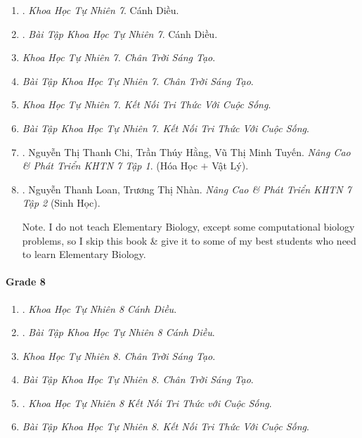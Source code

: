 \documentclass{article}
\begin{document}
\begin{enumerate}	
	\item \cite{SGK_KHTN_7_Canh_Dieu}. {\it Khoa Học Tự Nhiên 7}. Cánh Diều.\hfill{\sf[done]}
	
	\item \cite{SBT_KHTN_7_Canh_Dieu}. {\it Bài Tập  Khoa Học Tự Nhiên 7}. Cánh Diều.\hfill{\sf[done]}
	
	\item {\it Khoa Học Tự Nhiên 7. Chân Trời Sáng Tạo}.
	
	\item {\it Bài Tập Khoa Học Tự Nhiên 7. Chân Trời Sáng Tạo}.
	
	\item {\it Khoa Học Tự Nhiên 7. Kết Nối Tri Thức Với Cuộc Sống}.
	
	\item {\it Bài Tập Khoa Học Tự Nhiên 7. Kết Nối Tri Thức Với Cuộc Sống}.
	
	\item \cite{ncpt_KHTN_7_tap_1}. Nguyễn Thị Thanh Chi, Trần Thúy Hằng, Vũ Thị Minh Tuyến. {\it Nâng Cao \& Phát Triển KHTN 7 Tập 1}. (Hóa Học $+$ Vật Lý).\hfill{\sf[done]}
	
	\item \cite{ncpt_KHTN_7_tap_2}. Nguyễn Thanh Loan, Trương Thị Nhàn. {\it Nâng Cao \& Phát Triển KHTN 7 Tập 2} (Sinh Học).\hfill{\sf[done]}
	
	{\sf Note.} I do not teach Elementary Biology, except some computational biology problems, so I skip this book \& give it to some of my best students who need to learn Elementary Biology.
\end{enumerate}

\paragraph{Grade 8}

\begin{enumerate}
	\item \cite{SGK_KHTN_8_Canh_Dieu}. {\it Khoa Học Tự Nhiên 8 Cánh Diều}.\hfill{\sf[done]}
	
	\item \cite{SBT_KHTN_8_Canh_Dieu}. {\it Bài Tập Khoa Học Tự Nhiên 8 Cánh Diều}.\hfill{\sf[done]}
	
	\item {\it Khoa Học Tự Nhiên 8. Chân Trời Sáng Tạo}.
	
	\item {\it Bài Tập Khoa Học Tự Nhiên 8. Chân Trời Sáng Tạo}.
	
	\item \cite{SGK_KHTN_8_KNTTVCS}. {\it Khoa Học Tự Nhiên 8 Kết Nối Tri Thức với Cuộc Sống}.\hfill{\sf[done]}
	
	\item {\it Bài Tập Khoa Học Tự Nhiên 8. Kết Nối Tri Thức Với Cuộc Sống}.
\end{enumerate}
\end{document}
